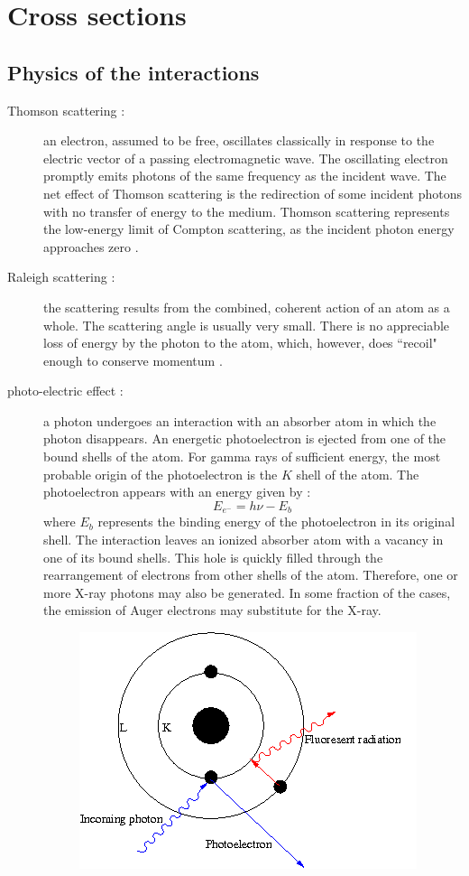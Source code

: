 \section{Cross sections}
\subsection{Physics of the interactions}

\begin{description}
\item [Thomson scattering :] an electron, assumed to be free, oscillates
classically in response to the electric vector of a passing electromagnetic
wave. The oscillating electron promptly emits photons of the same frequency as
the incident wave. The net effect of Thomson scattering is the redirection of
some incident photons with no transfer of energy to the medium. Thomson
scattering represents the low-energy limit of Compton scattering, as the
incident photon energy approaches zero \cite{radiation}.
\item [Raleigh scattering :] the scattering results from the combined,
coherent action of an atom as a whole. The scattering angle is usually very
small. There is no appreciable loss of energy by the photon to the atom,
which, however, does ``recoil" enough to conserve momentum \cite{radiation}.
\item [photo-electric effect :] a photon undergoes an interaction with an
absorber atom in which the photon disappears. An energetic photoelectron is
ejected from one of the bound shells of the atom. For gamma rays of
sufficient energy, the most probable origin of the photoelectron is the $K$
shell of the atom. The photoelectron appears with an energy given by :
\begin{equation}
E_{e^-} = h\nu -E_b
\end{equation}
where $E_b$ represents the binding energy of the photoelectron in its original
shell. The interaction leaves an ionized absorber atom with a vacancy in one
of its bound shells. This hole is quickly filled through the rearrangement of
electrons from other shells of the atom. Therefore, one or more X-ray photons
may also be generated. In some fraction of the cases, the emission of Auger
electrons may substitute for the X-ray. 
\begin{figure}[H]
\centering
\includegraphics[width=0.5\linewidth]{./Cross_Sections/images/photoelectric}

\end{figure}
\end{description}

